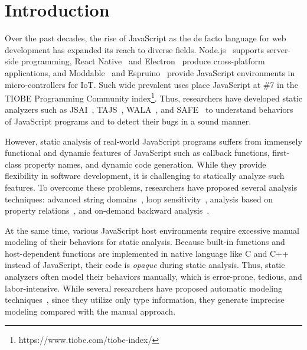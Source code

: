 \section{Introduction}\label{sec:intro}
Over the past decades, the rise of JavaScript as the de facto
language for web development has expanded its reach to diverse fields.
Node.js~\cite{nodejs} supports server-side programming, React
Native~\cite{react-native} and Electron~\cite{electron} produce cross-platform
applications, and Moddable~\cite{moddable} and Espruino~\cite{espruino}
provide JavaScript environments in micro-controllers for IoT.  Such wide prevalent
uses place JavaScript at \#7 in the TIOBE Programming Community
index\footnote{https://www.tiobe.com/tiobe-index/}.  Thus, researchers have
developed static analyzers such as JSAI~\cite{jsai}, TAJS~\cite{tajs},
WALA~\cite{wala}, and SAFE~\cite{safe,safe2} to understand behaviors of
JavaScript programs and to detect their bugs in a sound manner.

However, static analysis of real-world JavaScript programs suffers from immensely
functional and dynamic features of JavaScript such as callback
functions, first-class property names, and dynamic code generation.
While they provide flexibility in software development, it is
challenging to statically analyze such features.  To overcome these problems,
researchers have proposed several analysis techniques: advanced string
domains~\cite{string, regex, combining-string}, loop sensitivity~\cite{lsaECOOP,
lsaSPE}, analysis based on property relations~\cite{correlation, weaklyAPLAS,
weaklySPE, value-partitioning}, and on-demand backward
analysis~\cite{value-refinement}.

At the same time, various JavaScript host environments require excessive
manual modeling of their behaviors for static analysis.  Because built-in functions and
host-dependent functions are implemented in native language like C and
C++ instead of JavaScript, their code is \textit{opaque} during static
analysis.  Thus, static analyzers often model their behaviors
manually, which is error-prone, tedious, and labor-intensive.
While several researchers have proposed automatic modeling
techniques~\cite{safewapi, model-ts}, since they utilize only type
information, they generate imprecise modeling compared with the manual approach.

